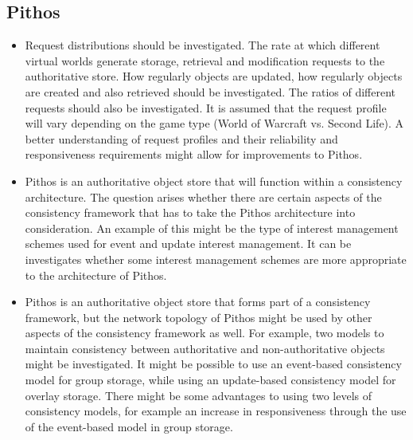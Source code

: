 \subsection{Pithos}
\begin{itemize}
\item Request distributions should be investigated. The rate at which different virtual worlds generate storage, retrieval and modification requests to the authoritative store. How regularly objects are updated, how regularly objects are created and also retrieved should be investigated. The ratios of different requests should also be investigated. It is assumed that the request profile will vary depending on the game type (World of Warcraft vs. Second Life). A better understanding of request profiles and their reliability and responsiveness requirements might allow for improvements to Pithos.

\item Pithos is an authoritative object store that will function within a consistency architecture. The question arises whether there are certain aspects of the consistency framework that has to take the Pithos architecture into consideration. An example of this might be the type of interest management schemes used for event and update interest management. It can be investigates whether some interest management schemes are more appropriate to the architecture of Pithos.

\item Pithos is an authoritative object store that forms part of a consistency framework, but the network topology of Pithos might be used by other aspects of the consistency framework as well. For example, two models to maintain consistency between authoritative and non-authoritative objects might be investigated. It might be possible to use an event-based consistency model for group storage, while using an update-based consistency model for overlay storage. There might be some advantages to using two levels of consistency models, for example an increase in responsiveness through the use of the event-based model in group storage.
\end{itemize}

